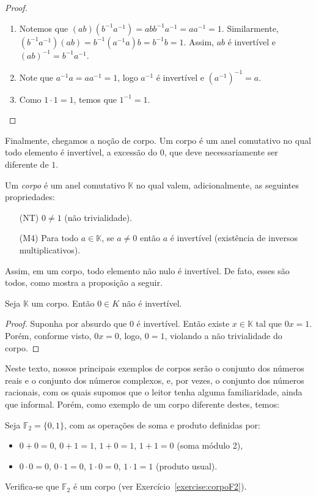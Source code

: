 \begin{proof}
    \begin{enumerate}[label=(\roman*)]
        \item Notemos que $(ab)(b^{-1}a^{-1})=abb^{-1}a^{-1}=aa^{-1}=1$. Similarmente, $(b^{-1}a^{-1})(ab)=b^{-1}(a^{-1}a)b=b^{-1}b=1$. Assim, $ab$ é invertível e $(ab)^{-1}=b^{-1}a^{-1}$.
        \item Note que $a^{-1}a=aa^{-1}=1$, logo $a^{-1}$ é invertível e $(a^{-1})^{-1}=a$.
        \item Como $1\cdot 1=1$, temos que $1^{-1}=1$.
    \end{enumerate}
\end{proof}

Finalmente, chegamos a noção de corpo.
Um corpo é um anel comutativo no qual todo elemento é invertível, a excessão do $0$, que deve necessariamente ser diferente de $1$.

\begin{definition}
    Um \emph{corpo} é um anel comutativo $\mathbb K$ no qual valem, adicionalmente, as seguintes propriedades:
    \begin{itemize}
        \item[(NT)] $0\neq 1$ (não trivialidade).
        \item[(M4)] Para todo $a\in \mathbb K$, se $a\neq 0$ então $a$ é invertível (existência de inversos multiplicativos).
    \end{itemize}
\end{definition}

Assim, em um corpo, todo elemento não nulo é invertível.
De fato, esses são todos, como mostra a proposição a seguir.

\begin{proposition}
    Seja $\mathbb K$ um corpo.
    Então $0\in K$ não é invertível.
\end{proposition}
\begin{proof}
    Suponha por absurdo que $0$ é invertível.
    Então existe $x \in \mathbb K$ tal que $0x=1$.
    Porém, conforme visto, $0x=0$, logo, $0=1$, violando a não trivialidade do corpo.
\end{proof}

Neste texto, nossos principais exemplos de corpos serão o conjunto dos números reais e o conjunto dos números complexos, e, por vezes, o conjunto dos números racionais, com os quais supomos que o leitor tenha alguma familiaridade, ainda que informal.
Porém, como exemplo de um corpo diferente destes, temos:

\begin{example}\label{example:corpoF2}
    Seja $\mathbb F_2=\{0, 1\}$, com as operações de soma e produto definidas por:
    \begin{itemize}
        \item $0+0=0$, $0+1=1$, $1+0=1$, $1+1=0$ (soma módulo 2),
        \item $0\cdot 0=0$, $0\cdot 1=0$, $1\cdot 0=0$, $1\cdot 1=1$ (produto usual).
    \end{itemize}
    Verifica-se que $\mathbb F_2$ é um corpo (ver Exercício~\ref{exercise:corpoF2}).
\end{example}